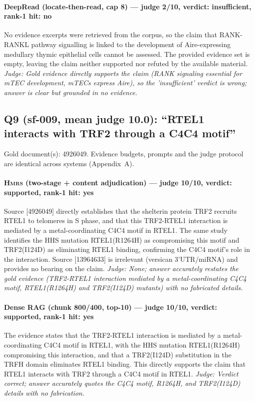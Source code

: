 \documentclass[sigconf, review, anonymous]{acmart}
\begin{document}
\paragraph{DeepRead (locate-then-read, cap 8) --- judge 2/10, verdict: insufficient, rank-1 hit: no}
\noindent No evidence excerpts were retrieved from the corpus, so the claim that RANK-RANKL pathway signalling is linked to the development of Aire-expressing medullary thymic epithelial cells cannot be assessed. The provided evidence set is empty, leaving the claim neither supported nor refuted by the available material.
\noindent\small\textit{Judge: Gold evidence directly supports the claim (RANK signaling essential for mTEC development, mTECs express Aire), so the 'insufficient' verdict is wrong; answer is clear but grounded in no evidence.}

\subsection{Q9 (sf-009, mean judge 10.0): ``RTEL1 interacts with TRF2 through a C4C4 motif''}
\label{app:q9}
\noindent Gold document(s): 4926049. Evidence budgets, prompts and the judge protocol are identical across systems (Appendix~A).
\paragraph{\textbf{\textsc{Hmrs}} (two-stage + content adjudication) --- judge 10/10, verdict: supported, rank-1 hit: yes}
\noindent Source [4926049] directly establishes that the shelterin protein TRF2 recruits RTEL1 to telomeres in S phase, and that this TRF2-RTEL1 interaction is mediated by a metal-coordinating C4C4 motif in RTEL1. The same study identifies the HHS mutation RTEL1(R1264H) as compromising this motif and TRF2(I124D) as eliminating RTEL1 binding, confirming the C4C4 motif's role in the interaction. Source [13964633] is irrelevant (versican 3'UTR/miRNA) and provides no bearing on the claim.
\noindent\small\textit{Judge: None; answer accurately restates the gold evidence (TRF2-RTEL1 interaction mediated by a metal-coordinating C4C4 motif, RTEL1(R1264H) and TRF2(I124D) mutants) with no fabricated details.}
\paragraph{Dense RAG (chunk 800/400, top-10) --- judge 10/10, verdict: supported, rank-1 hit: yes}
\noindent The evidence states that the TRF2-RTEL1 interaction is mediated by a metal-coordinating C4C4 motif in RTEL1, with the HHS mutation RTEL1(R1264H) compromising this interaction, and that a TRF2(I124D) substitution in the TRFH domain eliminates RTEL1 binding. This directly supports the claim that RTEL1 interacts with TRF2 through a C4C4 motif in RTEL1.
\noindent\small\textit{Judge: Verdict correct; answer accurately quotes the C4C4 motif, R1264H, and TRF2(I124D) details with no fabrication.}
\end{document}
